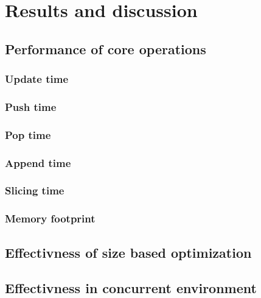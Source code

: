 \chapter{Results and discussion}
\section{Performance of core operations}
\subsection{Update time}
\subsection{Push time}
\subsection{Pop time}
\subsection{Append time}
\subsection{Slicing time}
\subsection{Memory footprint}
\section{Effectivness of size based optimization}
\section{Effectivness in concurrent environment}